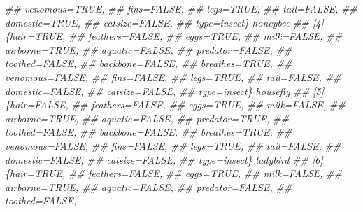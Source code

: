 \documentclass[
  notitlepage]{book}
\newenvironment{Shaded}{\begin{snugshade}}{\end{snugshade}}
\newcommand{\CommentTok}[1]{\textcolor[rgb]{0.56,0.35,0.01}{\textit{#1}}}
\begin{document}
\begin{Shaded}
\begin{Highlighting}[]
\CommentTok{\#\#      venomous=TRUE,                }
\CommentTok{\#\#      fins=FALSE,                   }
\CommentTok{\#\#      legs=TRUE,                    }
\CommentTok{\#\#      tail=FALSE,                   }
\CommentTok{\#\#      domestic=TRUE,                }
\CommentTok{\#\#      catsize=FALSE,                }
\CommentTok{\#\#      type=insect\}          honeybee}
\CommentTok{\#\# [4] \{hair=TRUE,                    }
\CommentTok{\#\#      feathers=FALSE,               }
\CommentTok{\#\#      eggs=TRUE,                    }
\CommentTok{\#\#      milk=FALSE,                   }
\CommentTok{\#\#      airborne=TRUE,                }
\CommentTok{\#\#      aquatic=FALSE,                }
\CommentTok{\#\#      predator=FALSE,               }
\CommentTok{\#\#      toothed=FALSE,                }
\CommentTok{\#\#      backbone=FALSE,               }
\CommentTok{\#\#      breathes=TRUE,                }
\CommentTok{\#\#      venomous=FALSE,               }
\CommentTok{\#\#      fins=FALSE,                   }
\CommentTok{\#\#      legs=TRUE,                    }
\CommentTok{\#\#      tail=FALSE,                   }
\CommentTok{\#\#      domestic=FALSE,               }
\CommentTok{\#\#      catsize=FALSE,                }
\CommentTok{\#\#      type=insect\}          housefly}
\CommentTok{\#\# [5] \{hair=FALSE,                   }
\CommentTok{\#\#      feathers=FALSE,               }
\CommentTok{\#\#      eggs=TRUE,                    }
\CommentTok{\#\#      milk=FALSE,                   }
\CommentTok{\#\#      airborne=TRUE,                }
\CommentTok{\#\#      aquatic=FALSE,                }
\CommentTok{\#\#      predator=TRUE,                }
\CommentTok{\#\#      toothed=FALSE,                }
\CommentTok{\#\#      backbone=FALSE,               }
\CommentTok{\#\#      breathes=TRUE,                }
\CommentTok{\#\#      venomous=FALSE,               }
\CommentTok{\#\#      fins=FALSE,                   }
\CommentTok{\#\#      legs=TRUE,                    }
\CommentTok{\#\#      tail=FALSE,                   }
\CommentTok{\#\#      domestic=FALSE,               }
\CommentTok{\#\#      catsize=FALSE,                }
\CommentTok{\#\#      type=insect\}          ladybird}
\CommentTok{\#\# [6] \{hair=TRUE,                    }
\CommentTok{\#\#      feathers=FALSE,               }
\CommentTok{\#\#      eggs=TRUE,                    }
\CommentTok{\#\#      milk=FALSE,                   }
\CommentTok{\#\#      airborne=TRUE,                }
\CommentTok{\#\#      aquatic=FALSE,                }
\CommentTok{\#\#      predator=FALSE,               }
\CommentTok{\#\#      toothed=FALSE,                }

\end{Highlighting}
\end{Shaded}
\end{document}
